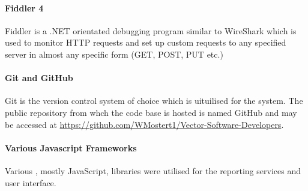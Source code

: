 \documentclass[11pt,a4paper,titlepage]{article}
\begin{document}
		\paragraph{Fiddler 4}
			Fiddler is a .NET orientated debugging program similar to WireShark which is used to monitor HTTP requests and set up custom requests to any specified server in almost any specific form (GET, POST, PUT etc.)
		\paragraph{Git and GitHub}
			Git is the version control system of choice which is uituilised for the system. The public repository from whch the code base is hosted is named GitHub and may be accessed at \url{https://github.com/WMostert1/Vector-Software-Developers}.
		\paragraph{Various Javascript Frameworks}
			Various , mostly JavaScript, libraries were utilised for the reporting services and user interface.


%  
\end{document}
